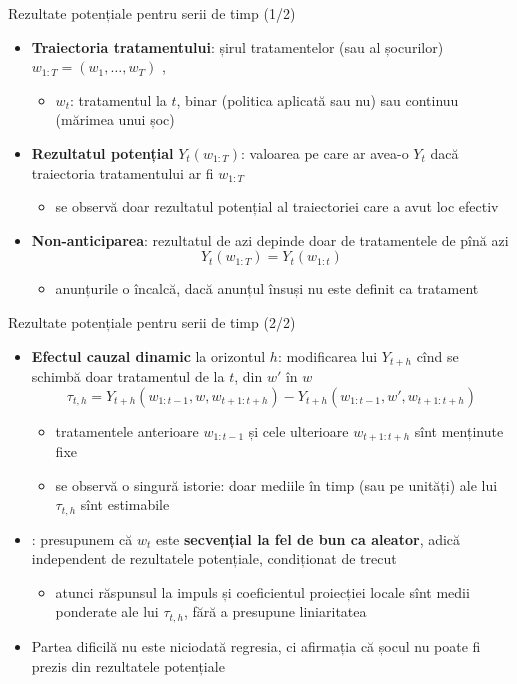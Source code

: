 \begin{frame}{Rezultate potențiale pentru serii de timp (1/2)}
\itemsize{\small}
\begin{itemize}
    \item \textbf{Traiectoria tratamentului}: șirul tratamentelor (sau al șocurilor) $w_{1:T} = (w_1, \dots, w_T)$ , 
    \begin{itemize}
        \item $w_t$: tratamentul la $t$, binar (politica aplicată sau nu) sau continuu (mărimea unui șoc)
    \end{itemize}
    \item \textbf{Rezultatul potențial} $Y_t(w_{1:T})$: valoarea pe care ar avea-o $Y_t$ dacă traiectoria tratamentului ar fi $w_{1:T}$
    \begin{itemize}
        \item se observă doar rezultatul potențial al traiectoriei care a avut loc efectiv
    \end{itemize}
    \item \textbf{Non-anticiparea}: rezultatul de azi depinde doar de tratamentele de pînă azi \[ Y_t(w_{1:T}) = Y_t(w_{1:t}) \]
    \begin{itemize}
        \item anunțurile o încalcă, dacă anunțul însuși nu este definit ca tratament
    \end{itemize}
\end{itemize}
\end{frame}

\begin{frame}{Rezultate potențiale pentru serii de timp (2/2)}
\itemsize{\small}
\begin{itemize}
    \item \textbf{Efectul cauzal dinamic} la orizontul $h$: modificarea lui $Y_{t+h}$ cînd se schimbă doar tratamentul de la $t$, din $w'$ în $w$ \[ \tau_{t,h} = Y_{t+h}(w_{1:t-1}, w, w_{t+1:t+h}) - Y_{t+h}(w_{1:t-1}, w', w_{t+1:t+h}) \]
    \begin{itemize}
        \item tratamentele anterioare $w_{1:t-1}$ și cele ulterioare $w_{t+1:t+h}$ sînt menținute fixe
        \item se observă o singură istorie: doar mediile în timp (sau pe unități) ale lui $\tau_{t,h}$ sînt estimabile
    \end{itemize}
    \item {}: presupunem că $w_t$ este \textbf{secvențial la fel de bun ca aleator}, adică independent de rezultatele potențiale, condiționat de trecut
    \begin{itemize}
        \item atunci răspunsul la impuls și coeficientul proiecției locale sînt medii ponderate ale lui $\tau_{t,h}$, fără a presupune liniaritatea
    \end{itemize}
    \item Partea dificilă nu este niciodată regresia, ci afirmația că șocul nu poate fi prezis din rezultatele potențiale
\end{itemize}
\end{frame}

